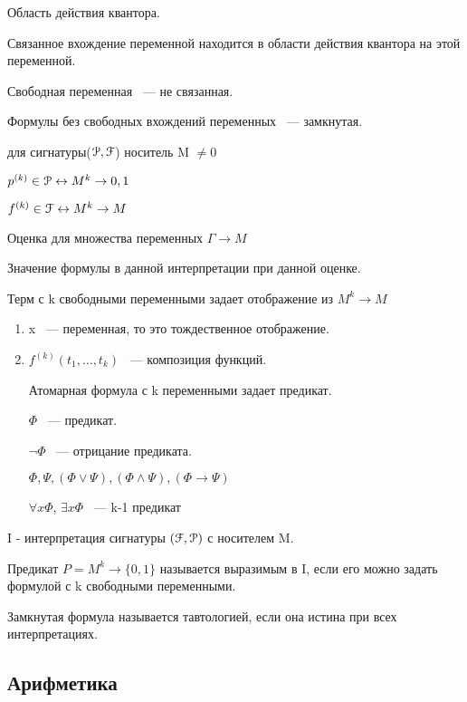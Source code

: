 \documentclass[12pt]{article}
\begin{document}
Область действия квантора.

Связанное вхождение переменной находится в области действия квантора на этой переменной. 

Свободная переменная ~--- не связанная.

Формулы без свободных вхождений переменных ~--- замкнутая.

\begin{description}
\item[Интерпретация:] для сигнатуры($\EuScript P, \EuScript F$) носитель M $\ne 0$

$p^{(k)} \in \EuScript P \leftrightarrow M^k \to {0, 1}$

$f^{(k)} \in \EuScript F \leftrightarrow M^k \to M$

Оценка для множества переменных $\Gamma \to M$

\item Значение формулы в данной интерпретации при данной оценке.

Терм с k свободными переменными задает отображение из $M^k \to M$

\begin{enumerate}
\item x ~--- переменная, то это тождественное отображение.

\item $f^{(k)}(t_1, \ldots, t_k)$ ~--- композиция функций.

Атомарная формула с k переменными задает предикат.

$\Phi$ ~--- предикат.

$\neg \Phi$ ~--- отрицание предиката.

$\Phi, \Psi, (\Phi \vee \Psi), (\Phi \wedge \Psi), (\Phi \to \Psi)$

$\forall x \Phi$,
$\exists x \Phi$ ~--- k-1 предикат
\end{enumerate}

\item[Определение] I - интерпретация сигнатуры $(\EuScript F, \EuScript P)$ с носителем M.

Предикат $P = M^k \to \{0, 1\}$ называется выразимым в I, если его можно задать формулой с k свободными переменными. 

\item Замкнутая формула называется тавтологией, если она истина при всех интерпретациях.

\end{description}

\subsection{Арифметика}
\end{document}
